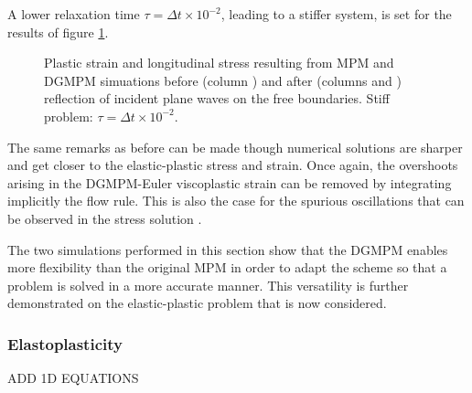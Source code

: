 A lower relaxation time $\tau=\Delta t \times 10^{-2}$, leading to a stiffer system, is set for the results of figure \ref{fig:siff_elastoviscoplastic_RP}.
\begin{figure}[h!]
  \centering
  { \label{subfig:evp_stiff1}}
  { \label{subfig:evp_stiff2}}
  { \label{subfig:evp_stiff3}}
  {}
  \caption{Plastic strain and longitudinal stress resulting from MPM and DGMPM simuations before (column ) and after (columns  and ) reflection of incident plane waves on the free boundaries. Stiff problem: $\tau=\Delta t \times 10^{-2}$.}
  \label{fig:siff_elastoviscoplastic_RP}
\end{figure}
The same remarks as before can be made though numerical solutions are sharper and get closer to the elastic-plastic stress and strain. Once again, the overshoots arising in the DGMPM-Euler viscoplastic strain can be removed by integrating implicitly the flow rule. This is also the case for the spurious oscillations that can be observed in the stress solution \cite{Thomas_EVP}. %

The two simulations performed in this section show that the DGMPM enables more flexibility than the original MPM in order to adapt the scheme so that a problem is solved in a more accurate manner. This versatility is further demonstrated on the elastic-plastic problem that is now considered.

\subsubsection{Elastoplasticity}
ADD 1D EQUATIONS

